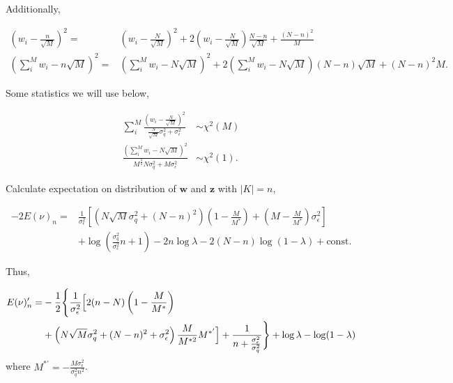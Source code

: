 Additionally, 

\begin{equation}
\begin{aligned}
    \left(w_i-\frac{n}{\sqrt{M}}\right)^2 =& \left(w_i - \frac{N}{\sqrt{M}}\right)^2 + 2\left(w_i - \frac{N}{\sqrt{M}}\right)\frac{N-n}{\sqrt{M}} + \frac{(N-n)^2}{M} \\
    \left(\sum_i^M w_i-n\sqrt{M}\right)^2 =& \left(\sum_i^M w_i-N\sqrt{M}\right)^2 + 2\left(\sum_i^M w_i-N\sqrt{M}\right)(N-n)\sqrt{M} + (N-n)^2M.
\end{aligned}
\end{equation}

Some statistics we will use below,

\begin{equation}
\begin{aligned}
    \sum_i^M\frac{(w_i - \frac{N}{\sqrt{M}})^2}{\frac{N}{\sqrt{M}}\sigma_q^2+\sigma_\epsilon^2} &\sim \chi^2(M) \\
    \frac{(\sum_i^M w_i-N\sqrt{M})^2}{M^{\frac{3}{2}}N\sigma_q^2+M\sigma_\epsilon^2} &\sim \chi^2(1).
\end{aligned}
\end{equation}

Calculate expectation on distribution of $\bm{w}$ and $\bm{z}$ with $|K|=n$, 

\begin{equation}
\begin{aligned}
    -2E(\nu)_n =& \frac{1}{\sigma_\epsilon^2}\left[\left(N\sqrt{M}\sigma_q^2+(N-n)^2\right)\left(1-\frac{M}{M^\ast}\right)+\left(M-\frac{M}{M^\ast}\right)\sigma_\epsilon^2\right] \\
    &+ \log\left(\frac{\sigma_q^2}{\sigma_\epsilon^2}n+1\right) - 2n\log\lambda - 2(N-n)\log(1-\lambda) + \mathrm{const}.
\end{aligned}
\end{equation}

Thus, 

\begin{equation}
\begin{aligned}
    E(\nu)_n' =& -\frac{1}{2}\Biggl\{\frac{1}{\sigma_\epsilon^2}\Bigl[2(n-N)\left(1-\frac{M}{M^\ast}\right) \\
    &+\left(N\sqrt{M}\sigma_q^2+(N-n)^2+\sigma_\epsilon^2\right)\frac{M}{M^{\ast2}}M^{\ast'}\Bigr] +\frac{1}{n+\frac{\sigma_\epsilon^2}{\sigma_q^2}}\Biggr\} + \log\lambda - \log(1-\lambda)
\end{aligned}
\end{equation}
where $M^{\ast'}=-\frac{M\sigma_\epsilon^2}{\sigma_q^2n^2}$. 


